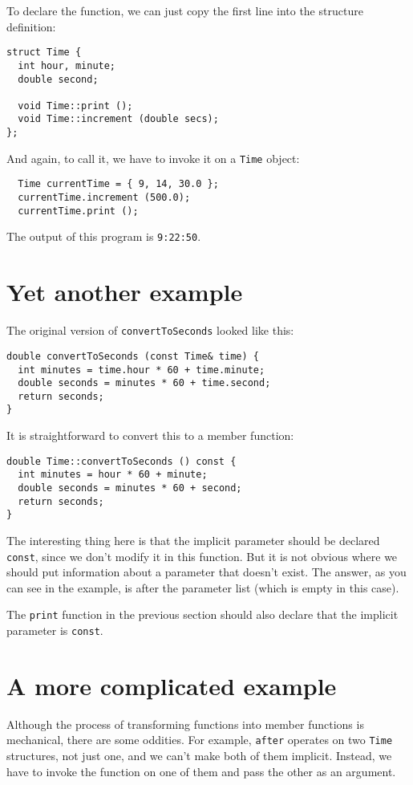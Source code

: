 {To declare the function, we can just copy the first line into the
structure definition:

\begin{verbatim}
struct Time {
  int hour, minute;
  double second;

  void Time::print ();
  void Time::increment (double secs);
};
\end{verbatim}
%
And again, to call it, we have to invoke it on a {\tt Time}
object:

\begin{verbatim}
  Time currentTime = { 9, 14, 30.0 };
  currentTime.increment (500.0);
  currentTime.print ();
\end{verbatim}
%
The output of this program is {\tt 9:22:50}.

\section{Yet another example}

The original version of {\tt convertToSeconds} looked like this:

\begin{verbatim}
double convertToSeconds (const Time& time) {
  int minutes = time.hour * 60 + time.minute;
  double seconds = minutes * 60 + time.second;
  return seconds;
}
\end{verbatim}
%
It is straightforward to convert this to a member function:

\begin{verbatim}
double Time::convertToSeconds () const {
  int minutes = hour * 60 + minute;
  double seconds = minutes * 60 + second;
  return seconds;
}
\end{verbatim}
%
The interesting thing here is that the implicit parameter should
be declared {\tt const}, since we don't modify it in this function.
But it is not obvious where we should put information about a
parameter that doesn't exist.  The answer, as you can see in the
example, is after the parameter list (which is empty in this case).

The {\tt print} function in the previous section should also
declare that the implicit parameter is {\tt const}.

\section {A more complicated example}

Although the process of transforming functions into member
functions is mechanical, there are some oddities.  For example,
{\tt after} operates on two {\tt Time} structures, not just
one, and we can't make both of them implicit.  Instead, we have
to invoke the function on one of them and pass the other as
an argument.

}
